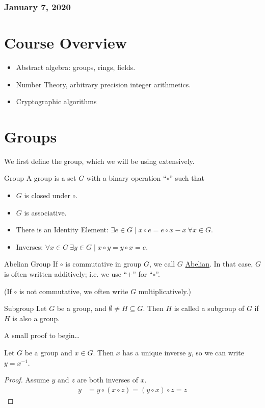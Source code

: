 \subsubsection*{January 7, 2020}
\section*{Course Overview}
\begin{itemize}
	\item Abstract algebra: groups, rings, fields.
	\item Number Theory, arbitrary precision integer arithmetics. 
	\item Cryptographic algorithms
\end{itemize}
\section{Groups}
We first define the group, which we will be using extensively. 
\begin{defn}{Group}
	A group is a set $G$ with a binary operation ``$\circ$'' such that
	\begin{itemize}
		\item $G$ is closed under $\circ$.
		\item $G$ is associative. 
		\item There is an Identity Element: $\exists e\in G \mid x\circ e = e\circ x - x \ \forall x\in G$. 
		\item Inverses: $\forall x \in G\ \exists y\in G\mid x\circ y = y \circ x = e$. 
	\end{itemize}
\end{defn}

\begin{defn}{Abelian Group}
If $\circ$ is commutative in group $G$, we call $G$ \ul{Abelian}. In that case, $G$ is often written additively; i.e. we use ``$+$'' for ``$\circ$''.

(If $\circ$ is not commutative, we often write $G$ multiplicatively.)	
\end{defn}

\begin{defn}{Subgroup}
Let $G$ be a group, and $\emptyset\neq H \subseteq G$. Then $H$ is called a subgroup of $G$ if $H$ is also a group. 
\end{defn}

A small proof to begin\dots 
\begin{proposition}
Let $G$ be a group and $x\in G$. Then $x$ has a unique inverse $y$, so we can write $y=x^{-1}$. 
\end{proposition}
\begin{proof}
Assume $y$ and $z$ are both inverses of $x$. 
\begin{align*}
y &= y \circ (x\circ z) = (y\circ x) \circ z = z	
\end{align*}
\end{proof}

